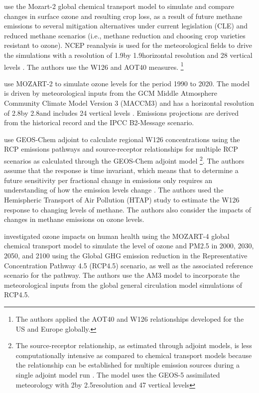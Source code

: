 \documentclass[10pt]{amsart}
\begin{document}
\cite{Avnery2013} use the Mozart-2 global chemical transport model to simulate and compare changes in surface ozone and resulting crop loss, as a result of future methane emissions to several mitigation alternatives under current legislation (CLE) and reduced methane scenarios (i.e., methane reduction and choosing crop varieties resistant to ozone). 
NCEP reanalysis is used for the meteorological fields to drive the simulations with a resolution of 1.9\degree by 1.9\degree horizontal resolution and 28 vertical levels \parencite{Avnery2013}.
The authors use the W126 and AOT40 measures. \footnote{The authors applied the AOT40 and W126 relationships developed for the US and Europe globally.} 

\cite{Wang2004} use MOZART-2 to simulate ozone levels for the period 1990 to 2020. 
The model is driven by meteorological inputs from the GCM Middle Atmosphere Community Climate Model Version 3 (MACCM3) and has a horizontal resolution of 2.8\degree by 2.8\degree and includes 24 vertical levels \parencite{Wang2004}. 
Emissions projections are derived from the historical record and the IPCC B2-Message scenario. 

\cite{Lapina2015} use GEOS-Chem adjoint to calculate regional W126 concentrations using the RCP emissions pathways and source-receptor relationships for multiple RCP scenarios as calculated through the GEOS-Chem adjoint model \footnote{The source-receptor relationship, as estimated through adjoint models, is less computationally intensive as compared to chemical transport models because the relationship can be established for multiple emission sources during a single adjoint model run \parencite{Lapina2015}. The model uses the GEOS-5 assimilated meteorology with 2\degree by 2.5\degree resolution and 47 vertical levels}.
The authors assume that the response is time invariant, which means that to determine a future sensitivity per fractional change in emissions only requires an understanding of how the emission levels change \parencite{Lapina2015}.
The authors used the Hemispheric Transport of Air Pollution (HTAP) study to estimate the W126 response to changing levels of methane.
The authors also consider the impacts of changes in methane emissions on ozone levels.

\cite{West2013} investigated ozone impacts on human health using the MOZART-4 global chemical transport model to simulate the level of ozone and PM2.5 in 2000, 2030, 2050, and 2100 using the Global GHG emission reduction in the Representative Concentration Pathway 4.5 (RCP4.5) scenario, as well as the associated reference scenario for the pathway. 
The authors use the AM3 model to incorporate the meteorological inputs from the global general circulation model simulations of RCP4.5.  
\end{document}
